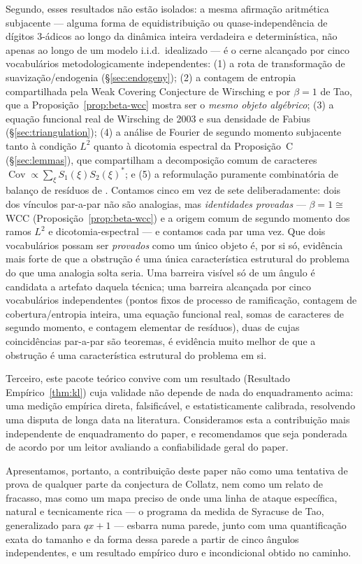 \documentclass[11pt]{article}
\theoremstyle{definition}
\theoremstyle{remark}
\DeclareMathOperator{\Cov}{Cov}
\begin{document}
Segundo, esses resultados não estão isolados: a mesma afirmação
aritmética subjacente --- alguma forma de equidistribuição ou
quase-independência de dígitos $3$-ádicos ao longo da dinâmica inteira
verdadeira e determinística, não apenas ao longo de um modelo i.i.d.\
idealizado --- é o cerne alcançado por cinco vocabulários
metodologicamente independentes: (1) a rota de transformação de
suavização/endogenia (\S\ref{sec:endogeny}); (2) a contagem de entropia
compartilhada pela Weak Covering Conjecture de Wirsching e por
$\beta=1$ de Tao, que a Proposição~\ref{prop:beta-wcc} mostra ser o
\emph{mesmo objeto algébrico}; (3) a equação funcional real de
Wirsching de 2003 e sua densidade de Fabius (\S\ref{sec:triangulation});
(4) a análise de Fourier de segundo momento subjacente tanto à condição
$L^2$ quanto à dicotomia espectral da Proposição~C
(\S\ref{sec:lemmas}), que compartilham a decomposição comum de
caracteres $\Cov\propto\sum_\xi S_1(\xi)S_2(\xi)^\ast$; e (5) a
reformulação puramente combinatória de balanço de resíduos de
\cite{Chang2026}. Contamos cinco em vez de sete deliberadamente: dois
dos vínculos par-a-par não são analogias, mas \emph{identidades
provadas} --- $\beta=1\cong$ WCC (Proposição~\ref{prop:beta-wcc}) e a
origem comum de segundo momento dos ramos $L^2$ e dicotomia-espectral
--- e contamos cada par uma vez. Que dois vocabulários possam ser
\emph{provados} como um único objeto é, por si só, evidência mais forte
de que a obstrução é uma única característica estrutural do problema
do que uma analogia solta seria. Uma barreira visível só de um ângulo é
candidata a artefato daquela técnica; uma barreira alcançada por cinco
vocabulários independentes (pontos fixos de processo de ramificação,
contagem de cobertura/entropia inteira, uma equação funcional real,
somas de caracteres de segundo momento, e contagem elementar de
resíduos), duas de cujas coincidências par-a-par são teoremas, é
evidência muito melhor de que a obstrução é uma característica
estrutural do problema em si.

Terceiro, este pacote teórico convive com um resultado
(Resultado Empírico~\ref{thm:kl}) cuja validade não depende de nada do
enquadramento acima: uma medição empírica direta, falsificável, e
estatisticamente calibrada, resolvendo uma disputa de longa data na
literatura. Consideramos esta a contribuição mais independente de
enquadramento do paper, e recomendamos que seja ponderada de acordo
por um leitor avaliando a confiabilidade geral do paper.

Apresentamos, portanto, a contribuição deste paper não como uma
tentativa de prova de qualquer parte da conjectura de Collatz, nem
como um relato de fracasso, mas como um mapa preciso de onde uma linha
de ataque específica, natural e tecnicamente rica --- o programa da
medida de Syracuse de Tao, generalizado para $qx+1$ --- esbarra numa
parede, junto com uma quantificação exata do tamanho e da forma dessa
parede a partir de cinco ângulos independentes, e um resultado
empírico duro e incondicional obtido no caminho.
\end{document}
